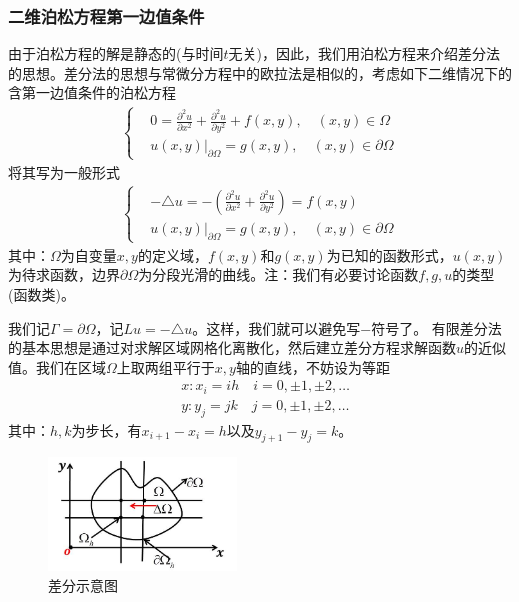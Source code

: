         \subsubsection{二维泊松方程第一边值条件}
            \par
            由于泊松方程的解是静态的(与时间$t$无关)，因此，我们用泊松方程来介绍差分法的思想。差分法的思想与常微分方程中的欧拉法是相似的，考虑如下二维情况下的含第一边值条件的泊松方程
            \begin{align*}
            \left\{
                \begin{aligned}
                    &0 = \frac{\partial^2 u}{\partial x^2} + \frac{\partial^2 u}{\partial y^2} + f(x,y),\quad (x,y)\in \Omega \\
                    &u(x,y)\bigl|_{\partial\Omega} = g(x,y),\quad (x,y)\in \partial\Omega
                \end{aligned}
            \right.
            \end{align*}
            将其写为一般形式
            \begin{align*}
                \left\{
                \begin{aligned}
                    &-\triangle u =-\left( \frac{\partial^2 u}{\partial x^2} + \frac{\partial^2 u}{\partial y^2} \right) = f(x,y)\\
                    &u(x,y)\bigl|_{\partial\Omega} = g(x,y),\quad (x,y)\in \partial\Omega
                \end{aligned}
                \right.
            \end{align*}
            其中：$\Omega $为自变量$x,y$的定义域，$f(x,y)$和$g(x,y)$为已知的函数形式，$u(x,y)$为待求函数，边界$\partial \Omega$为分段光滑的曲线。注：我们有必要讨论函数$f,g,u$的类型(函数类)。
            \par
            我们记$\Gamma = \partial \Omega$，记$Lu = -\triangle u$。这样，我们就可以避免写$-$符号了。
            有限差分法的基本思想是通过对求解区域网格化离散化，然后建立差分方程求解函数$u$的近似值。我们在区域$\Omega$上取两组平行于$x,y$轴的直线，不妨设为等距
            \begin{align*}
                &x:x_i = ih\quad i = 0,\pm1,\pm2,\dots\\
                &y:y_j = jk\quad j = 0,\pm1,\pm2,\dots
            \end{align*}
            其中：$h,k$为步长，有$x_{i+1} - x_i = h$以及$y_{j+1} - y_j = k$。
		\begin{figure}[H]
		\centering
		\includegraphics[width=5cm]{images/difference.jpg}
		\caption{差分示意图}
		\label{fig:差分示意图}
		\end{figure}

